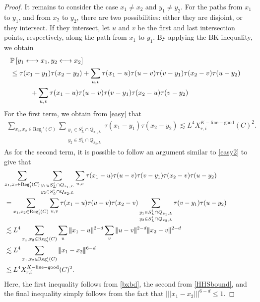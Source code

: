 \documentclass[11pt]{article}
\theoremstyle{definition}
\theoremstyle{remark}
\newcommand{\bP}{\mathbb{P}}
\numberwithin{equation}{section}
\theoremstyle{plain}
\theoremstyle{definition}
\theoremstyle{remark}
\theoremstyle{plain}
\newcommand{\tnorm}[1]{\vert\!\vert\!\vert #1 \vert\!\vert\!\vert}
\begin{document}
\begin{proof}
It remains to consider the case  $x_1\neq x_2$ and $y_1\neq y_2$. For the paths from $x_1$ to $y_1$, and from $x_2$ to $y_2$, there are two possibilities: either they are disjoint, or they intersect. If they intersect, let $u$ and $v$ be the first and last intersection points, respectively, along the path from $x_1$ to $y_1$. By applying the BK inequality, we obtain
\begin{align*}
 \lefteqn{\bP\left[y_1 \longleftrightarrow x_1,y_2 \longleftrightarrow x_2\right]}\\
 &\le \tau(x_1-y_1)\tau(x_2-y_2)+\sum_{u,v}\tau(x_1-u)\tau(u-v)\tau(v-y_1)\tau(x_2-v)\tau(u-y_2)\\
  &\hskip10mm+\sum_{u,v}\tau(x_1-u)\tau(u-v)\tau(v-y_1)\tau(x_2-u)\tau(v-y_2)
\end{align*}
For the first term, we obtain from \eqref{easy} that
\begin{align*}
  \sum_{x_1,x_2 \in \mathrm{Reg}_i'(C)}\sum_{\substack{y_1\in S_L^i\cap Q_{x_1,L}\\ y_2\in S_L^i\cap Q_{x_2,L}}}\tau(x_1-y_1)\tau(x_2-y_2)\lesssim L^4X_{r,i}^{K-\mathrm{line-good}}(C)^2.
\end{align*}
As for the second term, it is possible to follow an argument similar to \eqref{easy2} to give that
\begin{align*}
\lefteqn{\sum_{x_1,x_2 \in \mathrm{Reg}_i'(C)}\sum_{\substack{y_1\in S_L^i\cap Q_{x_1,L}\\ y_2\in S_L^i\cap Q_{x_2,L}}}\sum_{u,v}\tau(x_1-u)\tau(u-v)\tau(v-y_1)\tau(x_2-v)\tau(u-y_2)}\\
&=\lefteqn{\sum_{x_1,x_2 \in \mathrm{Reg}_i'(C)}\sum_{u,v}\tau(x_1-u)\tau(u-v)\tau(x_2-v)\sum_{\substack{y_1\in S_L^i\cap Q_{x_1,L}\\ y_2\in S_L^i\cap Q_{x_2,L}}}\tau(v-y_1)\tau(u-y_2)}\\
&\lesssim L^4\sum_{x_1,x_2 \in \mathrm{Reg}_i'(C)}\sum_{u}\tnorm{x_1-u}^{2-d}\sum_{v}\tnorm{u-v}^{2-d}\tnorm{x_2-v}^{2-d}\hspace{100pt}\\
&\lesssim L^4\sum_{x_1,x_2 \in \mathrm{Reg}_i'(C)}\tnorm{x_1-x_2}^{6-d}\\
&\lesssim L^4X_{r,i}^{K-\mathrm{line-good}}(C)^2.
\end{align*}
Here, the first inequality follows from \eqref{bxbd}, the second from \eqref{HHSbound}, and the final inequality simply follows from the fact that $\tnorm{x_1-x_2}^{6-d}\le 1$.



\end{proof}
\end{document}
